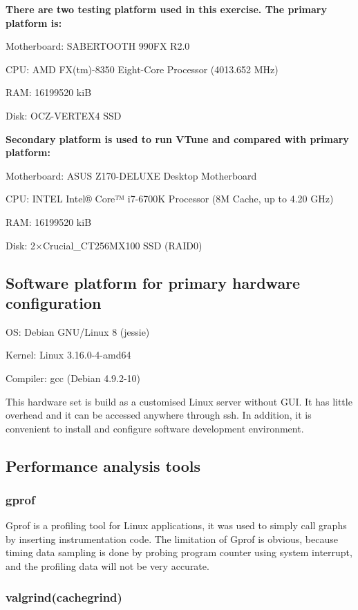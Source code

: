 \documentclass[conference]{IEEEtran}
\begin{document}
\textbf{There are two testing platform used in this exercise. The primary platform is:}

Motherboard:	SABERTOOTH 990FX R2.0

CPU:	AMD FX(tm)-8350 Eight-Core Processor (4013.652 MHz)

RAM:	16199520 kiB

Disk:	OCZ-VERTEX4 SSD

\textbf{Secondary platform is used to run VTune and compared with primary platform:}

Motherboard:	ASUS Z170-DELUXE Desktop Motherboard

CPU:	INTEL Intel® Core™ i7-6700K Processor (8M Cache, up to 4.20 GHz)

RAM:	16199520 kiB

Disk:	2$\times$Crucial\_CT256MX100 SSD (RAID0)
\subsection{Software platform for primary hardware configuration}

OS:	Debian GNU/Linux 8 (jessie)

Kernel:	Linux 3.16.0-4-amd64

Compiler:	gcc (Debian 4.9.2-10)

This hardware set is build as a customised Linux server without GUI. It has little overhead and it can be accessed anywhere through ssh. In addition, it is convenient to install and configure software development environment.

\subsection{Performance analysis tools}

\subsubsection{gprof}

Gprof is a profiling tool for Linux applications, it was used to simply call graphs by inserting instrumentation code. The limitation of Gprof is obvious, because timing data sampling is done by probing program counter using system interrupt, and the profiling data will not be very accurate.
\cite{graham1982gprof}

\subsubsection{valgrind(cachegrind)}
\end{document}
